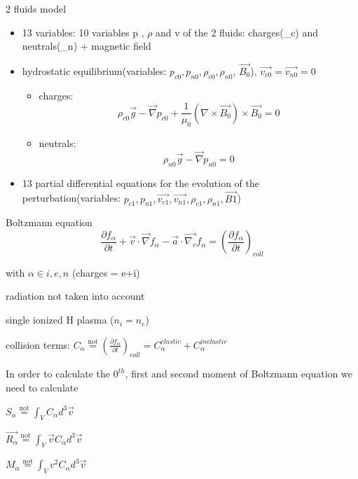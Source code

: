 \documentclass{beamer}
\begin{document}
\begin{frame}{2 fluids model}
\begin{itemize}
\item 13 variables: 10 variables p , $\rho$ and v of the 2 fluids: charges(\_c) and neutrals(\_n) + magnetic field
\item hydrostatic equilibrium(variables: $p_{c0}, p_{n0}, \rho_{c0}, \rho_{n0}$, $\vec{B_0}$), $\vec{v_{c0}}=\vec{v_{n0}}=0$
 
\begin{itemize}
\item charges:
\begin{equation}
\rho_{c0}\vec{g} - \vec{\nabla} p_{c0} + \frac{1}{\mu_0} (\nabla \times \vec{B_0}) \times \vec{B_0} = 0
\end{equation}

\item neutrals:
\begin{equation}
\rho_{n0}\vec{g} - \vec{\nabla} p_{n0}  = 0
\end{equation}

\end{itemize}
\item 13 partial differential equations for the evolution of the perturbation(variables: $p_{c1},p_{n1}, \vec{v_{c1}},\vec{v_{n1}},\rho_{c1}, \rho_{n1}, \vec{B1}$)

\end{itemize}

\end{frame}

\begin{frame}{Boltzmann equation}
\begin{equation}
\frac{\partial f_{\alpha} }{\partial t} + \vec{v} \cdot \vec{\nabla}  f_{\alpha} - \vec{a} \cdot \vec{\nabla_v} f_{\alpha} = (\frac{\partial f_{\alpha}}{\partial t})_{coll}
\end{equation}


with $\alpha \in {i,e,n}$ (charges = e+i)

radiation not taken into account

single ionized H plasma ($n_i = n_e$)

collision terms: $C_{\alpha} \stackrel{\text{not}}{=}  (\frac{\partial f_{\alpha}}{\partial t})_{coll} = C_{\alpha}^{elastic} + C_{\alpha}^{inelastic}$

In order to calculate the $0^{th}$, first and second moment of Boltzmann equation we need to calculate 

$S_\alpha \stackrel{\text{not}}{=} \int_V{C_\alpha d^3\vec{v}}$

$\vec{R_\alpha} \stackrel{\text{not}}{=} \int_V{\vec{v} C_\alpha d^3\vec{v}}$

$M_\alpha \stackrel{\text{not}}{=}  \int_V{v^2 C_\alpha d^3\vec{v}}$

\end{frame}
\end{document}
